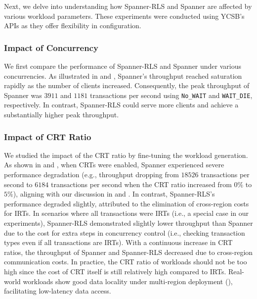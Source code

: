 Next, we delve into understanding how Spanner-RLS and Spanner are affected by various workload parameters. These experiments were conducted using YCSB's APIs as they offer flexibility in configuration.



\subsubsection{Impact of Concurrency} We first compare the performance of Spanner-RLS and Spanner under various concurrencies. As illustrated in  and , Spanner's throughput reached saturation rapidly as the number of clients increased. Consequently, the peak throughput of Spanner was $3911$ and $1181$ transactions per second using \texttt{No\_WAIT} and \texttt{WAIT\_DIE}, respectively. In contrast, Spanner-RLS could serve more clients and achieve a substantially higher peak throughput.

\subsubsection{Impact of CRT Ratio} We studied the impact of the CRT ratio by fine-tuning the workload generation. As shown in  and , when CRTs were enabled, Spanner experienced 
severe performance degradation (e.g., throughput dropping from $18526$ transactions per second to $6184$ transactions per second when the CRT ratio increased from $0\%$ to $5\%$), aligning with our discussion in  and . In contrast, Spanner-RLS's performance degraded slightly, attributed to the elimination of cross-region costs for IRTs. In scenarios where all transactions were IRTs (i.e., a special case in our experiments), Spanner-RLS demonstrated slightly lower throughput than Spanner due to the cost for extra steps in concurrency control (i.e., checking transaction types even if all transactions are IRTs). With a continuous increase in CRT ratios, the throughput of Spanner and Spanner-RLS decreased due to cross-region communication costs. In practice, the CRT ratio of workloads should not be too high since the cost of CRT itself is still relatively high compared to IRTs. Real-world workloads show good data locality under multi-region deployment (), facilitating low-latency data access.



